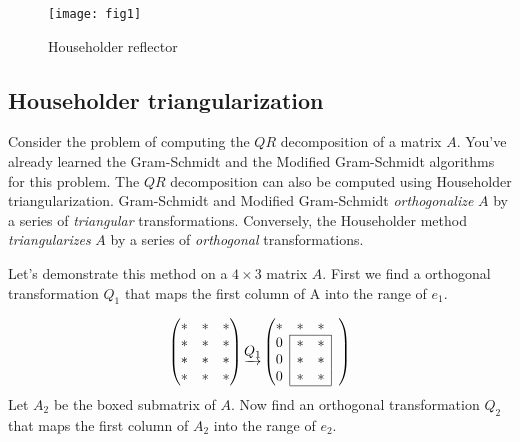\begin{figure}
	\centering
	\texttt{[image: fig1]}
	\caption{Householder reflector}
	\label{fig:Householder reflector}
\end{figure}

\subsection*{Householder triangularization}
Consider the problem of computing the $QR$ decomposition of a matrix $A$. You've already learned the Gram-Schmidt and the Modified Gram-Schmidt algorithms for this problem. The $QR$ decomposition can also be computed using Householder triangularization. Gram-Schmidt and Modified Gram-Schmidt \emph{orthogonalize} $A$ by a series of \emph{triangular} transformations. Conversely, the Householder method \emph{triangularizes} $A$ by a series of \emph{orthogonal} transformations.

Let's demonstrate this method on a $4 \times 3$ matrix $A$. First we find a orthogonal transformation $Q_1$ that maps the first column of A into the range of $e_1$.

\def\mc#1{\multicolumn{1}{c|}{#1}}
\begin{equation*}
\begin{pmatrix}
\ast & \ast & \ast \\
\ast & \ast & \ast \\
\ast & \ast & \ast \\
\ast & \ast & \ast 
\end{pmatrix}
\underrightarrow{Q_1}
\begin{pmatrix}

\ast & \ast & \ast & \\ \cline{2-3}
\mc{0} & \ast & \mc{\ast}& \\
\mc{0} & \ast & \mc{\ast} & \\
\mc{0}& \ast & \mc{\ast} & \\ \cline{2-3}
\end{pmatrix}
\end{equation*}
Let $A_2$ be the boxed submatrix of $A$. Now find an orthogonal transformation $Q_2$ that maps the first column of $A_2$ into the range of $e_2$. 

